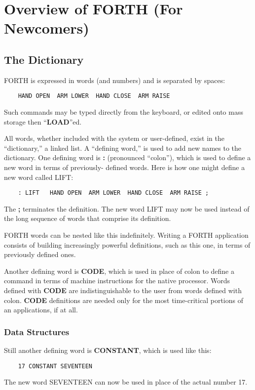 \appendix{}
\chapter{
Overview
of FORTH
(For Newcomers)
}
\section{The Dictionary}
FORTH is expressed in words (and numbers) and is separated by spaces:
\begin{verbatim}
    HAND OPEN  ARM LOWER  HAND CLOSE  ARM RAISE 
\end{verbatim}
Such commands may be typed directly from the keyboard, or edited onto 
mass storage then ``{\bf LOAD}''ed.

All words, whether included with the system or user-defined,
exist in the ``dictionary,'' a linked list.  A ``defining word,'' is used to add
new names to the dictionary.  One defining word is {\bf :} (pronounced
``colon''), which is used to define a new word in terms of previously-
defined words.  Here is how one might define a new word called LIFT:
\begin{verbatim}
    : LIFT   HAND OPEN  ARM LOWER  HAND CLOSE  ARM RAISE ;
\end{verbatim}
The {\bf ;} terminates the definition.  The new word LIFT may now be used
instead of the long sequence of words that comprise its definition.

FORTH words can be nested like this indefinitely.  Writing a 
FORTH application consists of building increasingly powerful definitions,
such as this one, in terms of previously defined ones.

Another defining word is {\bf CODE}, which is used in place of colon to
define a command in terms of machine instructions for the native processor.
Words defined with {\bf CODE} are indistinguishable to the user from 
words defined with colon.  {\bf CODE} definitions are needed only for the most
time-critical portions of an applications, if at all.
\subsection{Data Structures}
Still another defining word is {\bf CONSTANT}, which is used like this:
\begin{verbatim}
    17 CONSTANT SEVENTEEN
\end{verbatim}
The new word SEVENTEEN can now be used in place of the actual number 17.

